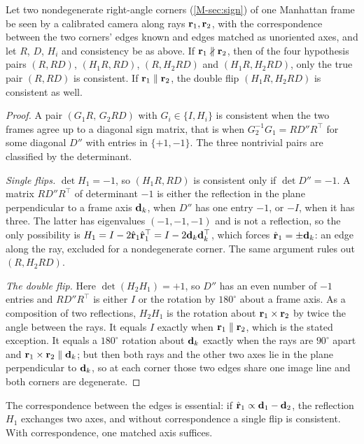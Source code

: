 \begin{theorem}\label{thm:mirror}
Let two nondegenerate right-angle corners (\cref{M-sec:sign}) of one Manhattan frame be seen by a calibrated camera along rays $\mathbf{r}_1,\mathbf{r}_2$, with the correspondence between the two corners' edges known and edges matched as unoriented axes, and let $R$, $D$, $H_i$ and consistency be as above. If $\mathbf{r}_1\nparallel\mathbf{r}_2$, then of the four hypothesis pairs $(R,RD)$, $(H_1R,RD)$, $(R,H_2RD)$ and $(H_1R,H_2RD)$, only the true pair $(R,RD)$ is consistent. If $\mathbf{r}_1\parallel\mathbf{r}_2$, the double flip $(H_1R,H_2RD)$ is consistent as well.
\end{theorem}
\begin{proof}
A pair $(G_1R,\,G_2RD)$ with $G_i\in\{I,H_i\}$ is consistent when the two frames agree up to a diagonal sign matrix, that is when $G_2^{-1}G_1=RD''R^{\top}$ for some diagonal $D''$ with entries in $\{+1,-1\}$. The three nontrivial pairs are classified by the determinant.

\emph{Single flips.} $\det H_1=-1$, so $(H_1R,RD)$ is consistent only if $\det D''=-1$. A matrix $RD''R^{\top}$ of determinant $-1$ is either the reflection in the plane perpendicular to a frame axis $\mathbf{d}_k$, when $D''$ has one entry $-1$, or $-I$, when it has three. The latter has eigenvalues $(-1,-1,-1)$ and is not a reflection, so the only possibility is $H_1=I-2\hat{\mathbf{r}}_1\hat{\mathbf{r}}_1^{\top}=I-2\mathbf{d}_k\mathbf{d}_k^{\top}$, which forces $\hat{\mathbf{r}}_1=\pm\mathbf{d}_k$: an edge along the ray, excluded for a nondegenerate corner. The same argument rules out $(R,H_2RD)$.

\emph{The double flip.} Here $\det(H_2H_1)=+1$, so $D''$ has an even number of $-1$ entries and $RD''R^{\top}$ is either $I$ or the rotation by $180^\circ$ about a frame axis. As a composition of two reflections, $H_2H_1$ is the rotation about $\mathbf{r}_1\times\mathbf{r}_2$ by twice the angle between the rays. It equals $I$ exactly when $\mathbf{r}_1\parallel\mathbf{r}_2$, which is the stated exception. It equals a $180^\circ$ rotation about $\mathbf{d}_k$ exactly when the rays are $90^\circ$ apart and $\mathbf{r}_1\times\mathbf{r}_2\parallel\mathbf{d}_k$; but then both rays and the other two axes lie in the plane perpendicular to $\mathbf{d}_k$, so at each corner those two edges share one image line and both corners are degenerate.
\end{proof}

The correspondence between the edges is essential: if $\hat{\mathbf{r}}_1\propto\mathbf{d}_1-\mathbf{d}_2$, the reflection $H_1$ exchanges two axes, and without correspondence a single flip is consistent. With correspondence, one matched axis suffices.

